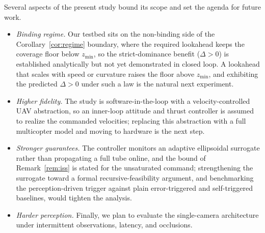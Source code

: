 \documentclass{ifacconf}
\begin{document}
Several aspects of the present study bound its scope and set the agenda for future work.
\begin{itemize}
\item \emph{Binding regime.} Our testbed sits on the non-binding side of the Corollary~\ref{cor:regime}
boundary, where the required lookahead keeps the coverage floor below $z_{\min}$, so the strict-dominance
benefit ($\Delta>0$) is established analytically but not yet demonstrated in closed loop. A lookahead that
scales with speed or curvature raises the floor above $z_{\min}$, and exhibiting the predicted $\Delta>0$
under such a law is the natural next experiment.
\item \emph{Higher fidelity.} The study is software-in-the-loop with a velocity-controlled UAV abstraction,
so an inner-loop attitude and thrust controller is assumed to realize the commanded velocities; replacing
this abstraction with a full multicopter model and moving to hardware is the next step.
\item \emph{Stronger guarantees.} The controller monitors an adaptive ellipsoidal surrogate rather than
propagating a full tube online, and the bound of Remark~\ref{rem:iss} is stated for the unsaturated
command; strengthening the surrogate toward a formal recursive-feasibility argument, and benchmarking the
perception-driven trigger against plain error-triggered and self-triggered baselines, would tighten the
analysis.
\item \emph{Harder perception.} Finally, we plan to evaluate the single-camera architecture under
intermittent observations, latency, and occlusions.
\end{itemize}

\end{document}
